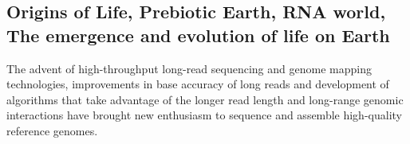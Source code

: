\subsection{Origins of Life, Prebiotic Earth, RNA world, The emergence and evolution of life on Earth}
%
%

The advent of high-throughput long-read sequencing\cite{} and genome mapping technologies\cite{}, improvements in base accuracy of long reads \cite{Wenger2019-pw} and development of algorithms that take advantage of the longer read length and long-range genomic interactions \cite{Dudchenko2017-kb} have brought new enthusiasm to sequence and assemble high-quality reference genomes\cite {}. 

